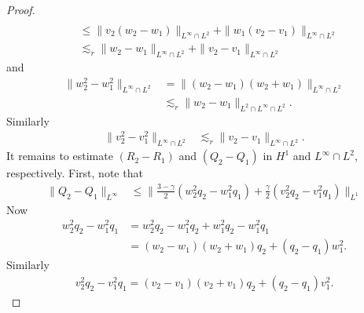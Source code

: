 \documentclass[12pt,reqno]{amsart}
\numberwithin{equation}{section}  %
\numberwithin{figure}{section}
\begin{document}
\begin{proof}
\begin{equation}
\begin{split}
  \\
  & \le \| v_{2}(w_{2} - w_{1}) \|_{L^{\infty} \cap L^{2}}  
  + \| w_{1}(v_{2} - v_{1}) \|_{L^{\infty} \cap L^{2}}  
  \\
  & \lesssim_{r} \| w_{2} - w_{1} \|_{L^{\infty} \cap L^{2}} +
  \| v_{2} - v_{1} \|_{L^{\infty} \cap L^{2}}
\end{split}
\end{equation}
%
%
and
%
\begin{equation}
  \label{2aa}
\begin{split}
  \| w^{2}_{2} - w_{1}^{2} \|_{L^{\infty} \cap L^{2}} 
  & = \| (w_{2} - w_{1})(w_{2} + w_{1}) \|_{L^{\infty} \cap L^{2}}
    \\
    & \lesssim_{r} \| w_{2} - w_{1} \|_{L^{2} \cap L^{\infty} \cap L^{2}}.
\end{split}
\end{equation}
%
Similarly
%
%
\begin{equation}
  \label{3aa}
\begin{split}
\| v^{2}_{2} - v_{1}^{2} \|_{L^{\infty} \cap L^{2}} 
& \lesssim_{r}\| v_{2} - v_{1} \|_{L^{\infty} \cap L^{2}}.
\end{split}
\end{equation}
%
%
It remains to estimate $(R_{2} - R_{1})$ and $(Q_{2} - Q_{1})$ in $H^{1}$
and $L^{\infty} \cap L^{2}$, respectively. First, note that
%
%
\begin{equation}
\begin{split}
  \| Q_{2} - Q_{1} \|_{L^{\infty}}
  & \le \| \frac{3 - \gamma}{2} (w_{2}^{2} q_{2} - w_{1}^{2} q_{1}) +
  \frac{\gamma}{2}(v_{2}^{2}q_{2} - v_{1}^{2}q_{1}) \|_{L^{1}}
\end{split}
\end{equation}
%
%
Now
%
%
\begin{equation*}
\begin{split}
  w_{2}^{2} q_{2} - w_{1}^{2} q_{1}
  & = w_{2}^{2} q_{2} - w_{1}^{2} q_{2} + w_{1}^{2} q_{2} - w_{1}^{2} q_{1}
  \\
  & = (w_{2} - w_{1})(w_{2} + w_{1})q_{2} + (q_{2} - q_{1})w_{1}^{2}.
\end{split}
\end{equation*}
%
%
Similarly
%
%
\begin{equation*}
\begin{split}
  v_{2}^{2}q_{2} - v_{1}^{2} q_{1} = (v_{2} - v_{1})(v_{2}  + v_{1})q_{2} + (q_{2} - q_{1})v_{1}^{2}.
\end{split}
\end{equation*}
%
%

\end{proof}
\end{document}
